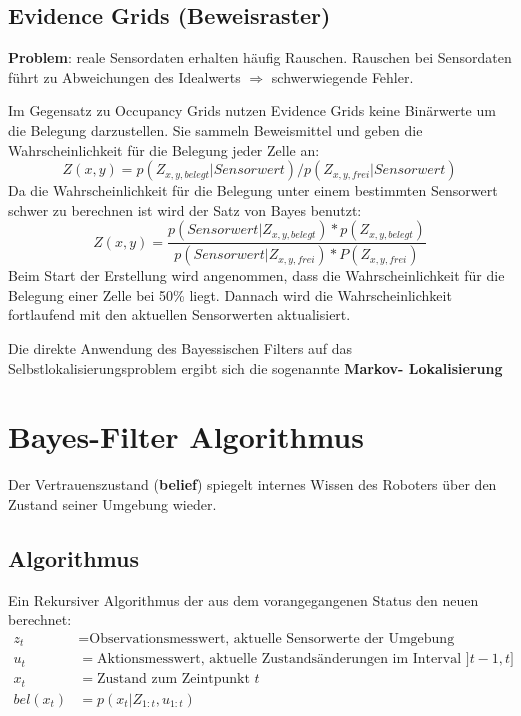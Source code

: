 \subsection{Evidence Grids (Beweisraster)}
\textbf{Problem}: reale Sensordaten erhalten häufig Rauschen.
Rauschen bei  Sensordaten führt zu Abweichungen des Idealwerts $\Rightarrow$
schwerwiegende Fehler.

Im Gegensatz zu Occupancy Grids nutzen Evidence Grids keine Binärwerte um die
Belegung darzu\-stellen. Sie sammeln Beweismittel und geben die
Wahrscheinlichkeit für die Belegung jeder Zelle an:
$$
	Z(x,y) = p(Z_{x,y,belegt} | Sensorwert) / p(Z_{x,y,frei} | Sensorwert)
$$
Da die Wahrscheinlichkeit für die Belegung unter einem bestimmten Sensorwert
schwer zu berechnen ist wird der Satz von Bayes benutzt:
$$
	Z(x,y) = \frac{p(Sensorwert | Z_{x,y,belegt}) * p(Z_{x,y,belegt})}
								{p(Sensorwert | Z_{x,y,frei}) * P(Z_{x,y,frei})}
$$
Beim Start der Erstellung wird angenommen, dass die Wahrscheinlichkeit für die
Belegung einer Zelle bei 50\% liegt. Dannach wird die Wahrscheinlichkeit
fortlaufend mit den aktuellen Sensorwerten aktualisiert.

Die direkte Anwendung des Bayessischen Filters auf das
Selbstlokalisierungsproblem ergibt sich die sogenannte \textbf{Markov-
Lokalisierung}

\section{Bayes-Filter Algorithmus}
Der Vertrauenszustand (\textbf{belief}) spiegelt internes Wissen des Roboters
über den Zustand seiner Umgebung wieder.

\subsection{Algorithmus}
Ein Rekursiver Algorithmus der aus dem vorangegangenen Status den neuen
berechnet:
\begin{align*}
	z_t &= \text{Observationsmesswert, aktuelle Sensorwerte der Umgebung} \\
	u_t &= \text{Aktionsmesswert, aktuelle Zustandsänderungen im Interval }
		]t-1, t] \\
	x_t &= \text{Zustand zum Zeintpunkt }t \\
	bel(x_t) &= p(x_t | Z_{1:t}, u_{1:t}) \\
\end{align*}

